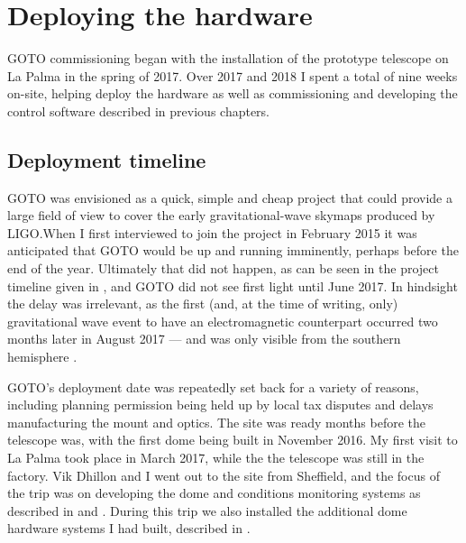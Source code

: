 \section{Deploying the hardware}
\label{sec:hardware_commissioning}
\begin{colsection}


\begin{colsection}

GOTO commissioning began with the installation of the prototype telescope on La Palma in the spring of 2017. Over 2017 and 2018 I spent a total of nine weeks on-site, helping deploy the hardware as well as commissioning and developing the control software described in previous chapters.

\end{colsection}


\subsection{Deployment timeline}
\label{sec:timeline}
\begin{colsection}

GOTO was envisioned as a quick, simple and cheap project that could provide a large field of view to cover the early gravitational-wave skymaps produced by LIGO.\@ When I first interviewed to join the project in February 2015 it was anticipated that GOTO would be up and running imminently, perhaps before the end of the year. Ultimately that did not happen, as can be seen in the project timeline given in , and GOTO did not see first light until June 2017. In hindsight the delay was irrelevant, as the first (and, at the time of writing, only) gravitational wave event to have an electromagnetic counterpart occurred two months later in August 2017 --- and was only visible from the southern hemisphere \citep{GW170817,GW170817_followup}.

GOTO's deployment date was repeatedly set back for a variety of reasons, including planning permission being held up by local tax disputes and delays manufacturing the mount and optics. The site was ready months before the telescope was, with the first dome being built in November 2016. My first visit to La Palma took place in March 2017, while the the telescope was still in the factory. Vik Dhillon and I went out to the site from Sheffield, and the focus of the trip was on developing the dome and conditions monitoring systems as described in  and . During this trip we also installed the additional dome hardware systems I had built, described in .


\end{colsection}
\end{colsection}
